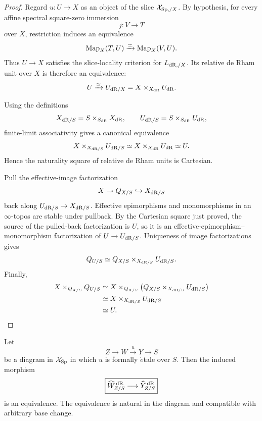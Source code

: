 \begin{proof}
Regard \(u:U\to X\) as an object of the slice
\(\mathcal X_{\mathrm{Sp},/X}\).  By hypothesis, for every affine spectral
square-zero immersion
\[
    j:V\longrightarrow T
\]
over \(X\), restriction induces an equivalence
\[
    \operatorname{Map}_X(T,U)
    \xrightarrow{\simeq}
    \operatorname{Map}_X(V,U).
\]
Thus \(U\to X\) satisfies the slice-locality criterion for \(L_{\mathrm{dR},/X}\).  Its relative de Rham
unit over \(X\) is therefore an equivalence:
\[
    U
    \xrightarrow{\simeq}
    U_{\mathrm{dR}/X}
    =
    X\times_{X_{\mathrm{dR}}}U_{\mathrm{dR}}.
\]

Using the definitions
\[
    X_{\mathrm{dR}/S}=S\times_{S_{\mathrm{dR}}}X_{\mathrm{dR}},
    \qquad
    U_{\mathrm{dR}/S}=S\times_{S_{\mathrm{dR}}}U_{\mathrm{dR}},
\]
finite-limit associativity gives a canonical equivalence
\[
    X\times_{X_{\mathrm{dR}/S}}U_{\mathrm{dR}/S}
    \simeq
    X\times_{X_{\mathrm{dR}}}U_{\mathrm{dR}}
    \simeq U.
\]
Hence the naturality square of relative de Rham units is Cartesian.

Pull the effective-image factorization
\[
    X\twoheadrightarrow Q_{X/S}\hookrightarrow X_{\mathrm{dR}/S}
\]
back along \(U_{\mathrm{dR}/S}\to X_{\mathrm{dR}/S}\).  Effective epimorphisms and monomorphisms in an
\(\infty\)-topos are stable under pullback.  By the Cartesian square just proved, the source of the
pulled-back factorization is \(U\), so it is an effective-epimorphism--monomorphism factorization of
\(U\to U_{\mathrm{dR}/S}\).  Uniqueness of image factorizations gives
\[
    Q_{U/S}
    \simeq
    Q_{X/S}\times_{X_{\mathrm{dR}/S}}U_{\mathrm{dR}/S}.
\]
Finally,
\[
\begin{aligned}
    X\times_{Q_{X/S}}Q_{U/S}
    &\simeq
    X\times_{Q_{X/S}}
    \left(
        Q_{X/S}\times_{X_{\mathrm{dR}/S}}U_{\mathrm{dR}/S}
    \right)
    \\
    &\simeq
    X\times_{X_{\mathrm{dR}/S}}U_{\mathrm{dR}/S}
    \\
    &\simeq U.
\end{aligned}
\]
\end{proof}

\begin{proposition}
\label{prop:formal-etale-completion-invariance}
Let
\[
    Z\longrightarrow W\xrightarrow{u}Y\longrightarrow S
\]
be a diagram in \(\mathcal X_{\mathrm{Sp}}\) in which \(u\) is formally \(\acute{e}\)tale over \(S\).
Then the induced morphism
\[
\boxed{
    \widehat W^{\,\mathrm{dR}}_{Z/S}
    \longrightarrow
    \widehat Y^{\,\mathrm{dR}}_{Z/S}
}
\]
is an equivalence.  The equivalence is natural in the diagram and compatible with arbitrary base
change.
\end{proposition}

